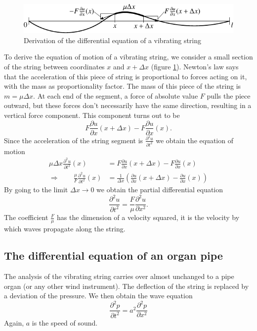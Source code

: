 \begin{figure}
\begin{center}
\includegraphics[width=\hsize]{../common/images/saite-1}
\end{center}
\caption{Derivation of the differential equation of a vibrating string
\label{saite}}
\end{figure}
To derive the equation of motion of a vibrating string, we consider
a small section of the string between coordinates $x$ and $x+\Delta x$
(figure \ref{saite}).
Newton's law says that the acceleration of this piece of string 
is proportional to forces acting on it, with the mass as proportionality
factor.
The mass of this piece of the string is $m=\mu\Delta x$.
At each end of the segment, a force of absolute value $F$ pulls the piece
outward, but these forces don't necessarily have the same direction,
resulting in a vertical force component.
This component turns out to be
\[
F\frac{\partial u}{\partial x}(x+\Delta x)-F\frac{\partial u}{\partial x}(x).
\]
Since the acceleration of the string segment is
$\frac{\partial^2u}{\partial t^2}$
we obtain the equation of motion
\begin{align*}
\mu\Delta x\frac{\partial^2u}{\partial t^2}(x)&=
F\frac{\partial u}{\partial x}(x+\Delta x)-F\frac{\partial u}{\partial x}(x)\\
\Rightarrow\qquad
\frac{\mu}{F}\frac{\partial^2u}{\partial t^2}(x)&=
\frac1{\Delta x}\left(\frac{\partial u}{\partial x}(x+\Delta x)-\frac{\partial u}{\partial x}(x)\right)
\end{align*}
By going to the limit 
$\Delta x\to 0$ we obtain the partial differential equation
\[
\frac{\partial^2u}{\partial t^2}=\frac{F}{\mu}\frac{\partial^2u}{\partial x^2}.
\]
The coefficient
$\frac{F}{\mu}$
has the dimension of a velocity squared, it is the velocity by which waves
propagate along the string.

\subsection{The differential equation of an organ pipe}
The analysis of the vibrating string carries over almost unchanged
to a pipe organ (or any other wind instrument).
The deflection of the string is replaced by a deviation of the pressure.
We then obtain the wave equation
\[
\frac{\partial^2p}{\partial t^2}=
a^2\frac{\partial^2p}{\partial x^2}
\]
Again, $a$ is the speed of sound.

